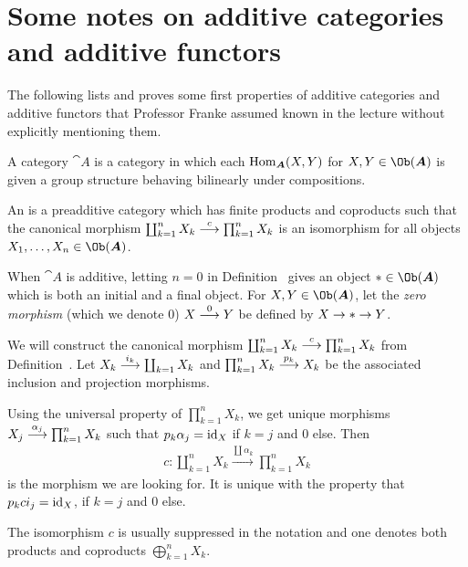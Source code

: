 \documentclass[a4paper,parskip=half,numbers=enddot, DIV=12]{scrreprt}
\begin{document}
\section{Some notes on additive categories and additive functors}
The following lists and proves some first properties of additive categories and additive functors that Professor Franke assumed known in the lecture without explicitly mentioning them.
\begin{defi}
	\begin{alphanumerate}
		\item {}A  category ${\cat A}$ is a category in which each $\Hom_{\cat A}(X,Y)$ for $X,Y\in\Ob({\cat A})$ is given a group structure behaving bilinearly under compositions.
		\item An  is a preadditive category which has finite products and coproducts such that the canonical morphism $\coprod_{k=1}^nX_k\morphism[c] \prod_{k=1}^{n}X_k$ is an isomorphism for all objects $X_1,\ldots,X_n\in\Ob({\cat A})$.
	\end{alphanumerate}
\end{defi}
\begin{rem*}
	\begin{alphanumerate}
		\item When ${\cat A}$ is additive, letting $n=0$ in Definition~ gives an object $*\in\Ob({\cat A})$ which is both an initial and a final object. For $X,Y\in\Ob({\cat A})$, let the \emph{zero morphism} (which we denote $0$) $X\morphism[0]Y$ be defined by $X\morphism *\morphism Y$.
		\item We will construct the canonical morphism $\coprod_{k=1}^nX_k\morphism[c] \prod_{k=1}^{n}X_k$ from Definition~. Let $X_k\morphism[i_k]\coprod_{k=1}X_k$ and $\prod_{k=1}^nX_k\morphism[p_k]X_k$ be the associated inclusion and projection morphisms.
		
		Using the universal property of $\prod_{k=1}^{n}X_k$, we get unique morphisms $X_j\morphism[\alpha_j]\prod_{k=1}^{n}X_k$ such that $p_k\alpha_j=\operatorname{id}_X$ if $k=j$ and $0$ else. Then 
		\begin{align*}
		c\colon \coprod_{k=1}^nX_k\xrightarrow{\coprod\alpha_k}\prod_{k=1}^{n}X_k
		\end{align*}
		is the morphism we are looking for. It is unique with the property that $p_k c i_j=\operatorname{id}_X$, if $k=j$ and $0$ else.
		\item The isomorphism $c$ is usually suppressed in the notation and one denotes both products and coproducts $\bigoplus_{k=1}^nX_k$.
	\end{alphanumerate}
\end{rem*}
\end{document}
